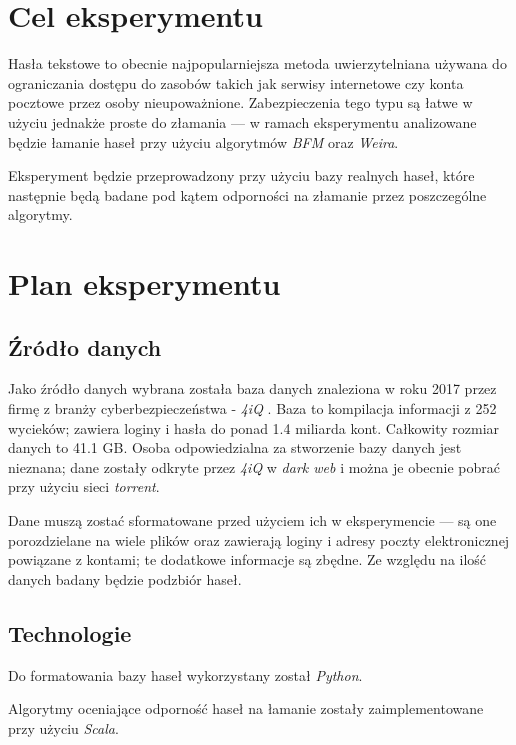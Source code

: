 \documentclass{article}
\begin{document}
\section{Cel eksperymentu}
Hasła tekstowe to obecnie najpopularniejsza metoda uwierzytelniana używana do ograniczania dostępu do zasobów takich jak serwisy internetowe czy konta pocztowe przez osoby nieupoważnione. Zabezpieczenia tego typu są łatwe w użyciu jednakże proste do złamania — w ramach eksperymentu analizowane będzie łamanie haseł przy użyciu algorytmów \textit{BFM} oraz \textit{Weira}.

Eksperyment będzie przeprowadzony przy użyciu bazy realnych haseł, które następnie będą badane pod kątem odporności na złamanie przez poszczególne algorytmy.

\section{Plan eksperymentu}
\subsection{Źródło danych}
Jako źródło danych wybrana została baza danych znaleziona w roku 2017 przez firmę z branży cyberbezpieczeństwa - \textit{4iQ} \cite{breach}. Baza to kompilacja informacji z 252 wycieków; zawiera loginy i hasła do ponad 1.4 miliarda kont. Całkowity rozmiar danych to 41.1 GB. Osoba odpowiedzialna za stworzenie bazy danych jest nieznana; dane zostały odkryte przez \textit{4iQ} w \textit{dark web} i można je obecnie pobrać przy użyciu sieci \textit{torrent}.

Dane muszą zostać sformatowane przed użyciem ich w eksperymencie — są one porozdzielane na wiele plików oraz zawierają loginy i adresy poczty elektronicznej powiązane z kontami; te dodatkowe informacje są zbędne. Ze względu na ilość danych badany będzie podzbiór haseł.

\subsection{Technologie}
Do formatowania bazy haseł wykorzystany został \textit{Python}.

Algorytmy oceniające odporność haseł na łamanie zostały zaimplementowane przy użyciu \textit{Scala}.
\end{document}
